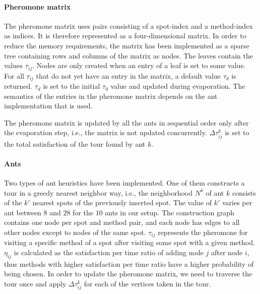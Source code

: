 \documentclass{article}
\begin{document}
\paragraph{Pheromone matrix}

The pheromone matrix uses pairs consisting of a spot-index and a method-index as indices. It is therefore represented as a four-dimensional
matrix. In order to reduce the memory requirements, the matrix has been implemented as a sparse tree containing rows and columns of the
matrix as nodes. The leaves contain the values $\tau_{ij}$. Nodes are only created when an entry of a leaf is set to some value. For all
$\tau_{ij}$ that do not yet have an entry in the matrix, a default value $\tau_d$ is returned. $\tau_d$ is set to the initial $\tau_0$ value 
and updated during evaporation. The semantics of the entries in the pheromone matrix depends on the ant implementation that is used.

The pheromone matrix is updated by all the ants in sequential order only after the evaporation step, i.e., the matrix is not updated
concurrently. $\Delta\tau_{ij}^k$ is set to the total satisfaction of the tour found by ant $k$.

\paragraph{Ants}

Two types of ant heuristics have been implemented. One of them constructs a tour in a greedy nearest neighbor way, i.e., the neighborhood
$N^k$ of ant $k$ consists of the $k'$ nearest spots of the previously inserted spot. The value of $k'$ varies per ant between $8$ and $28$
for the $10$ ants in our setup. The construction graph contains one node per spot and method pair, and each node has edges to all other
nodes except to nodes of the same spot. $\tau_{ij}$ represents the pheromone for visiting a specific method of a spot after visiting some
spot with a given method. $\eta_{ij}$ is calculated as the satisfaction per time ratio of adding node $j$ after node $i$, thus methods with
higher satisfaction per time ratio have a higher probability of being chosen.
In order to update the pheromone matrix, we need to traverse the tour once and apply $\Delta\tau_{ij}^k$ for each of the vertices taken in the tour.
\end{document}
